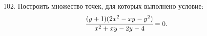 102. Построить множество точек, для которых выполнено условие:
$$\cfrac{(y+1)(2x^2-xy-y^2)}{x^2+xy-2y-4}=0.$$
